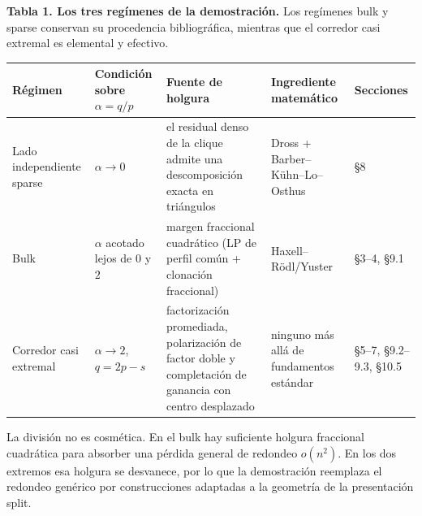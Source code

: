 \documentclass[
  spanish,
  11pt,
  a4paper,
]{article}
\newcounter{none} %
\begin{document}
\textbf{Tabla 1. Los tres regímenes de la demostración.} Los regímenes bulk y sparse conservan su procedencia bibliográfica, mientras que el corredor casi extremal es elemental y efectivo.

{\def\LTcaptype{none} %
\begin{longtable}[]{@{}
  >{\raggedright\arraybackslash}p{}
  >{\raggedright\arraybackslash}p{}
  >{\raggedright\arraybackslash}p{}
  >{\raggedright\arraybackslash}p{}
  >{\raggedright\arraybackslash}p{}@{}}
\toprule\noalign{}
\begin{minipage}[b]{\linewidth}\raggedright
Régimen
\end{minipage} & \begin{minipage}[b]{\linewidth}\raggedright
Condición sobre \(\alpha=q/p\)
\end{minipage} & \begin{minipage}[b]{\linewidth}\raggedright
Fuente de holgura
\end{minipage} & \begin{minipage}[b]{\linewidth}\raggedright
Ingrediente matemático
\end{minipage} & \begin{minipage}[b]{\linewidth}\raggedright
Secciones
\end{minipage} \\
\midrule\noalign{}
\endhead
\bottomrule\noalign{}
\endlastfoot
Lado independiente sparse & \(\alpha\to 0\) & el residual denso de la clique admite una descomposición exacta en triángulos & Dross + Barber--Kühn--Lo--Osthus & §8 \\
Bulk & \(\alpha\) acotado lejos de \(0\) y \(2\) & margen fraccional cuadrático (LP de perfil común + clonación fraccional) & Haxell--Rödl/Yuster & §3--4, §9.1 \\
Corredor casi extremal & \(\alpha\to 2\), \(q=2p-s\) & factorización promediada, polarización de factor doble y completación de ganancia con centro desplazado & ninguno más allá de fundamentos estándar & §5--7, §9.2--9.3, §10.5 \\
\end{longtable}
}

La división no es cosmética. En el bulk hay suficiente holgura fraccional cuadrática para absorber una pérdida general de redondeo \(o(n^2)\). En los dos extremos esa holgura se desvanece, por lo que la demostración reemplaza el redondeo genérico por construcciones adaptadas a la geometría de la presentación split.
\end{document}
